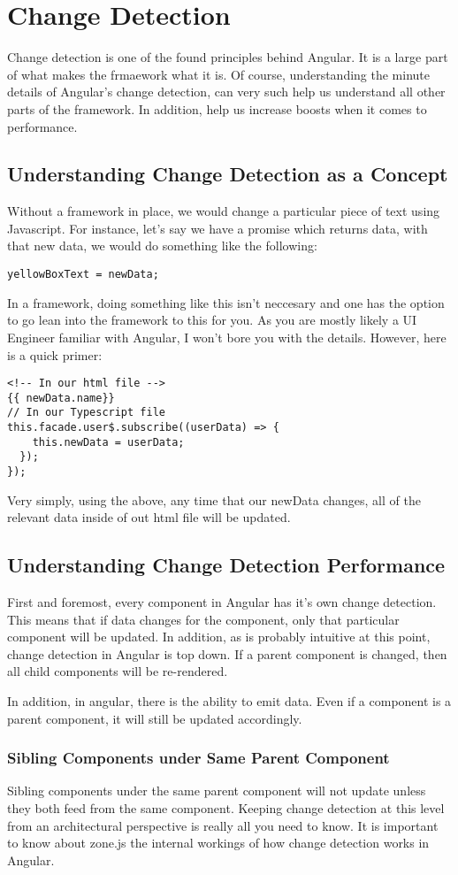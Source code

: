 \section{ Change Detection }


Change detection is one of the found principles behind Angular. It is a large
part of what makes the frmaework what it is. Of course, understanding the
minute details of Angular's change detection, can very such help us understand
all other parts of the framework. In addition, help us increase boosts when it
comes to performance.

\subsection{Understanding Change Detection as a Concept}
Without a framework in place, we would change a particular piece of text
using Javascript. For instance, let's say we have a promise which returns data,
with that new data, we would do something like the following:

\begin{lstlisting}
yellowBoxText = newData;
\end{lstlisting}

In a framework, doing something like this isn't neccesary and one has the option
to go lean into the framework to this for you. As you are mostly likely a UI
Engineer familiar with Angular, I won't bore you with the details. However, here
is a quick primer:
\begin{lstlisting}
<!-- In our html file -->
{{ newData.name}}
// In our Typescript file
this.facade.user$.subscribe((userData) => {
    this.newData = userData;
  });
});
\end{lstlisting}

Very simply, using the above, any time that our newData changes, all of the
relevant data inside of out html file will be updated.

\subsection{ Understanding Change Detection Performance }
First and foremost, every component in Angular has it's own change detection.
This means that if data changes for the component, only that particular
component will be updated. In addition, as is probably intuitive at this point,
change detection in Angular is top down. If a parent component is changed, then
all child components will be re-rendered.

In addition, in angular, there is the ability to emit data. Even if a component
is a parent component, it will still be updated accordingly.

\subsubsection{ Sibling Components under Same Parent Component }
Sibling components under the same parent component will not update unless they
both feed from the same component. Keeping change detection at this level
from an architectural perspective is really all you need to know. It is
important to know about zone.js the internal workings of how change detection
works in Angular. 
